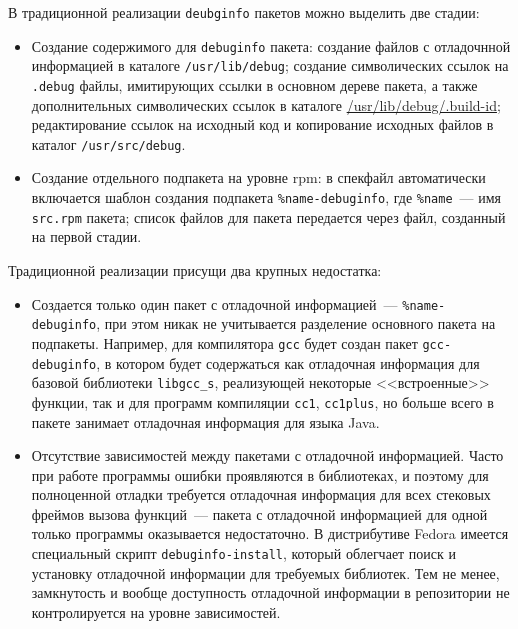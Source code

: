 \documentclass[russian,a4paper,12pt,titlepage]{article}
\begin{document}
В традиционной реализации \verb|deubginfo| пакетов можно выделить две стадии:
\begin{itemize}
\item Создание содержимого для \verb|debuginfo| пакета: создание файлов с отладочнной информацией
в каталоге \verb|/usr/lib/debug|; создание символических ссылок на \verb|.debug| файлы, имитирующих
ссылки в основном дереве пакета, а также дополнительных символических ссылок в каталоге \url{/usr/lib/debug/.build-id};
редактирование ссылок на исходный код и копирование исходных файлов в каталог \verb|/usr/src/debug|.
\item Создание отдельного подпакета на уровне rpm: в спекфайл автоматически включается шаблон создания
подпакета \verb|%name-debuginfo|, где \verb|%name|~--- имя \verb|src.rpm| пакета; список файлов для пакета
передается через файл, созданный на первой стадии.
\end{itemize}

Традиционной реализации присущи два крупных недостатка:
\begin{itemize}
\item Создается только один пакет с отладочной информацией~--- \verb|%name-debuginfo|, при этом никак не учитывается
разделение основного пакета на подпакеты.  Например, для компилятора \verb|gcc| будет создан пакет \verb|gcc-debuginfo|,
в котором будет содержаться как отладочная информация для базовой библиотеки \verb|libgcc_s|, реализующей некоторые <<встроенные>>
функции, так и для программ компиляции \verb|cc1|, \verb|cc1plus|, но больше всего в пакете занимает отладочная информация для языка Java.
\item Отсутствие зависимостей между пакетами с отладочной информацией.  Часто при работе программы ошибки проявляются в библиотеках,
и поэтому для полноценной отладки требуется отладочная информация для всех стековых фреймов вызова функций~--- пакета с отладочной
информацией для одной только программы оказывается недостаточно.  В дистрибутиве Fedora имеется специальный скрипт \verb|debuginfo-install|,
который облегчает поиск и установку отладочной информации для требуемых библиотек.
Тем не менее, замкнутость и вообще доступность отладочной информации в репозитории не контролируется на уровне зависимостей.
\end{itemize}
\end{document}
